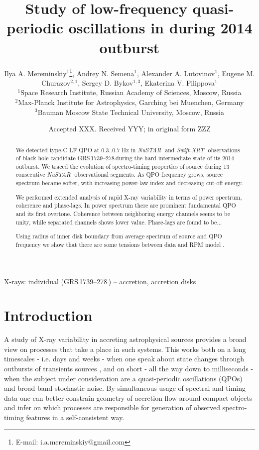 \documentclass[a4paper,fleqn,usenatbib]{mnras}
\title[Study of low-frequency QPO in \grs]{Study of low-frequency quasi-periodic oscillations in \grs during 2014 outburst}
\author[I. A. Mereminskiy et al.]{
Ilya A. Mereminskiy$^{1}$\thanks{E-mail: i.a.mereminskiy@gmail.com},
Andrey N. Semena$^{1}$,
Alexander A. Lutovinov$^{1}$, \newauthor
Eugene M. Churazov$^{2,1}$,
Sergey D. Bykov$^{1,3}$,
Ekaterina V. Filippova$^{1}$
\\
$^{1}$Space Research Institute, Russian Academy of Sciences, Moscow, Russia\\
$^{2}$Max-Planck Institute for Astrophysics, Garching bei Muenchen, Germany\\
$^{3}$Bauman Moscow State Technical University, Moscow, Russia\\
}
\date{Accepted XXX. Received YYY; in original form ZZZ}
\def\grs{{GRS\,1739--278\,}}
\def\swiftx{{\em Swift-XRT\,}}
\def\nustar{{\em NuSTAR\,}}
\begin{document}
\label{firstpage}
\pagerange{\pageref{firstpage}--\pageref{lastpage}}
\maketitle

\begin{abstract}
We detected type-C LF QPO at 0.3..0.7 Hz in \nustar\, and \swiftx\, observations of black hole candidate \grs during the hard-intermediate state of its 2014 outburst. We traced the evolution of spectro-timing properties of source during 13 consecutive \nustar\, observational segments. As QPO frequency grows, source spectrum became softer, with increasing power-law index and decreasing cut-off energy.

We performed extended analysis of rapid X-ray variability in terms of power spectrum, coherence and phase-lags. In power spectrum there are prominent fundamental QPO and its first overtone. Coherence between neighboring energy channels seems to be unity, while separated channels shows lower value. Phase-lags are found to be...

Using radius of inner disk boundary from average spectrum of source and QPO frequency we show that there are some tensions between data and RPM model \citep{ingram09}.
\end{abstract}

\begin{keywords}
X-rays: individual (\grs)  -- accretion, accretion disks	
\end{keywords}


\section{Introduction}
\label{sec:intro} 
A study of X-ray variability in accreting astrophysical sources provides a broad view on processes that take a place in such systems. This works both on a long timescales - i.e. days and weeks - when one speak about state changes through outbursts of transients sources  \citep[see e.g.][]{2005Ap&SS.300..107H, heil15}, and on short - all the way down to milliseconds - when the subject under consideration are a quasi-periodic oscillations (QPOs) and broad band stochastic noise. By simultaneous usage of spectral and timing data one can better constrain geometry of accretion flow around compact objects and infer on which processes are responsible for generation of observed spectro-timing features in a self-consistent way.
\end{document}
